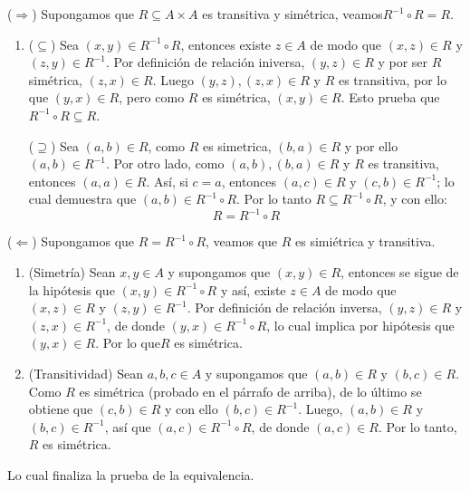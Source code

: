 \documentclass[letterpaper,DIV=14,headsepline,12pt]{scrartcl}
\makeatletter
\renewenvironment{proof}[1][]{%
        \par\pushQED{\qed}%
        \normalfont\topsep6pt \partopsep0pt %
        \trivlist
        \item[\hskip\labelsep
                \textbf{\textit{Demostración.}}%
        ]#1
        }{%
        \popQED\endtrivlist\@endpefalse
    }
\makeatother
\begin{document}
    \begin{proof}
        ($\Rightarrow$) Supongamos que $R \subseteq A \times A$ es transitiva y simétrica, veamos$R^{-1}\circ R=R$.
        \begin{enumerate}[\hspace{.3cm}]
            \item ($\subseteq$) Sea $(x,y) \in R^{-1}\circ R$, entonces existe $z \in A$ de modo que $(x,z) \in R$ y $(z,y) \in R^{-1}$. Por definición de relación iniversa, $(y,z) \in R$ y por ser $R$ simétrica, $(z,x) \in R$. Luego $(y,z),(z,x) \in R$ y $R$ es transitiva, por lo que $(y,x) \in R$, pero como $R$ es simétrica, $(x,y) \in R$. Esto prueba que $R^{-1}\circ R \subseteq R$.
            
            ($\supseteq$) Sea $(a,b) \in R$, como $R$ es simetrica, $(b,a) \in R$ y por ello $(a,b) \in R^{-1}$. Por otro lado, como $(a,b),(b,a) \in R$ y $R$ es transitiva, entonces $(a,a) \in R$. Así, si $c=a$, entonces $(a,c) \in R$ y $(c,b) \in R^{-1}$; lo cual demuestra que $(a,b) \in R^{-1} \circ R$. Por lo tanto $R \subseteq R^{-1} \circ R$, y con ello:
            \[ R=R^{-1}\circ R \]
        \end{enumerate}

        ($\Leftarrow$) Supongamos que $R=R^{-1}\circ R$, veamos que $R$ es simiétrica y transitiva.
        \begin{enumerate}[\hspace{.3cm}]
            \item (Simetría) Sean $x,y \in A$ y supongamos que $(x,y) \in R$, entonces se sigue de la hipótesis que $(x,y) \in R^{-1}\circ R$ y así, existe $z \in A$ de modo que $(x,z) \in R$ y $(z,y) \in R^{-1}$. Por definición de relación inversa, $(y,z)\in R$ y $(z,x) \in R^{-1}$, de donde $(y,x) \in R^{-1} \circ R$, lo cual implica por hipótesis que $(y,x) \in R$. Por lo que$R$ es simétrica.
            
            \item (Transitividad) Sean $a,b,c \in A$ y supongamos que $(a,b) \in R$ y $(b,c) \in R$. Como $R$ es simétrica (probado en el párrafo de arriba), de lo último se obtiene que $(c,b) \in R$ y con ello $(b,c) \in R^{-1}$. Luego, $(a,b) \in R$ y $(b,c) \in R^{-1}$, así que $(a,c) \in R^{-1} \circ R$, de donde $(a,c) \in R$. Por lo tanto, $R$ es simétrica.
        \end{enumerate}
        Lo cual finaliza la prueba de la equivalencia.
    \end{proof}
\end{document}
